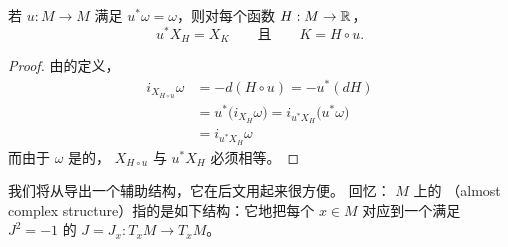 \begin{proposition}\label{prop:sympl-preserves-hamiltonian-fields}
若 $u:M\to M$ 满足 $u^{*}\omega=\omega$，则对每个函数 $H:M\to\mathbb{R}$，
\[
u^{*}X_H=X_K\qquad\text{且}\qquad K=H\circ u.
\]
\end{proposition}
\begin{proof}
由\trHamiltonianVectorField{}的定义，
\begin{align*}
i_{X_{H\circ u}}\omega &= -d(H\circ u) = -u^{*}(dH)\\
&= u^{*}\bigl(i_{X_H}\omega\bigr) = i_{u^{*}X_H}\bigl(u^{*}\omega\bigr)\\
&= i_{u^{*}X_H}\omega
\end{align*}
而由于 $\omega$ 是\trNondegenerate{}的，\trVectorField{} $X_{H\circ u}$ 与 $u^{*}X_H$%
必须相等。
\end{proof}

我们将从\trSymplecticStructure{}导出一个辅助结构，它在后文用起来很方便。%
回忆：\trManifold{} $M$ 上的\textbf{\trAlmostComplexStructure}%
（almost complex structure）指的是如下结构：它\trSmooth{}地把每个 $x\in M$%
对应到一个满足 $J^{2}=-1$ 的\trLinear\trMapping{} $J=J_x:T_xM\to T_xM$。

